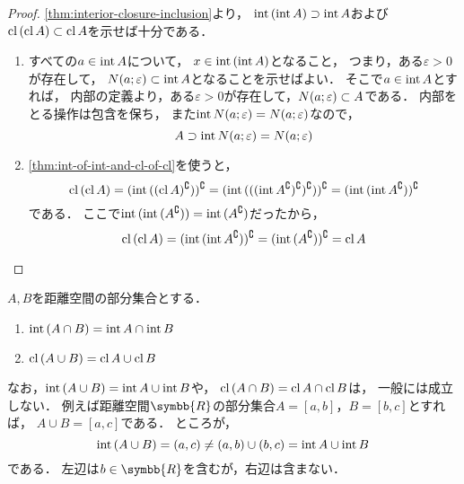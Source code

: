 \documentclass[../sotsu.tex]{subfiles}
\begin{document}
\begin{proof}
    \cref{thm:interior-closure-inclusion}より，
    $\operatorname{int}{(\operatorname{int}{A})} \supset \operatorname{int}{A}$および$\operatorname{cl}{(\operatorname{cl}{A})} \subset \operatorname{cl}{A}$を示せば十分である．
    \begin{enumerate}
        \item すべての$a \in \operatorname{int}{A}$について，
            $x \in \operatorname{int}{(\operatorname{int}{A})}$となること，
            つまり，ある$\varepsilon > 0$が存在して，
            $N(a; \varepsilon) \subset \operatorname{int}{A}$となることを示せばよい．
            そこで$a \in \operatorname{int}{A}$とすれば，
            内部の定義より，ある$\varepsilon > 0$が存在して，$N(a; \varepsilon) \subset A$である．
            内部をとる操作は包含を保ち，
            また$\operatorname{int}{N(a; \varepsilon)} = N(a; \varepsilon)$なので，
            \[  A \supset \operatorname{int}{N(a; \varepsilon)} = N(a; \varepsilon)  \]
        \item \cref{thm:int-of-int-and-cl-of-cl}を使うと，
            \[
                \operatorname{cl}{(\operatorname{cl}{A})} 
                = (\operatorname{int}{((\operatorname{cl}{A})^\complement)})^\complement  
                = (
                    \operatorname{int}{(
                        (
                            (\operatorname{int}{A^\complement})^\complement
                        )^\complement
                    )}
                  )^\complement  
                = (\operatorname{int}{(\operatorname{int}{A^\complement})})^\complement  
            \]
            である．
            ここで$\operatorname{int}{(\operatorname{int}{(A^\complement)})} = \operatorname{int}{(A^\complement)}$だったから，
            \[
                \operatorname{cl}{(\operatorname{cl}{A})} 
                = (\operatorname{int}{(\operatorname{int}{A^\complement})})^\complement  
                = (\operatorname{int}{(A^\complement)})^\complement
                = \operatorname{cl}{A}
                \qedhere
            \]
    \end{enumerate}
\end{proof}


\begin{proposition}
    \label{thm:int-of-intersection-and-cl-of-union}
    $A, B$を距離空間の部分集合とする．
    \begin{enumerate}
        \item $\operatorname{int}{(A \cap B)} = \operatorname{int}{A} \cap \operatorname{int}{B}$
        \item $\operatorname{cl}{(A \cup B)} = \operatorname{cl}{A} \cup \operatorname{cl}{B}$
    \end{enumerate}
\end{proposition}

なお，$\operatorname{int}{(A \cup B)} = \operatorname{int}{A} \cup \operatorname{int}{B}$や，
$\operatorname{cl}{(A \cap B)} = \operatorname{cl}{A} \cap \operatorname{cl}{B}$は，
一般には成立しない．
例えば距離空間$\symbb{R}$の部分集合$A = [a, b]$，$B = [b, c]$とすれば，
$A \cup B = [a, c]$である．
ところが，
\[  \operatorname{int}{(A \cup B)} = (a, c)
    \neq
    (a, b) \cup (b, c) 
    = \operatorname{int}{A} \cup \operatorname{int}{B}  \]
である．
左辺は$b \in \symbb{R}$を含むが，右辺は含まない．
\end{document}
